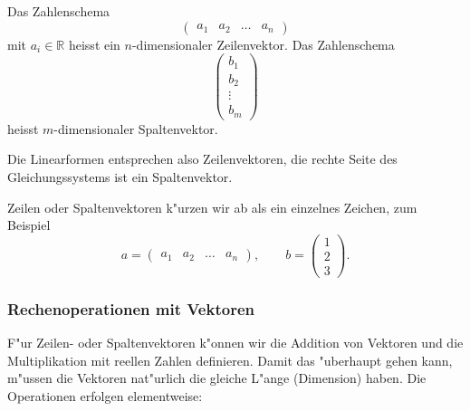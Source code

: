 \begin{definition}
Das Zahlenschema
\[
\begin{pmatrix}
a_1&a_2&\dots&a_n
\end{pmatrix}
\]
mit $a_i\in\mathbb R$ heisst ein $n$-dimensionaler Zeilenvektor.
Das Zahlenschema
\[
\begin{pmatrix}
b_1\\b_2\\\vdots\\b_m
\end{pmatrix}
\]
heisst $m$-dimensionaler Spaltenvektor.
\end{definition}
Die Linearformen entsprechen also Zeilenvektoren, die rechte
Seite des Gleichungssystems ist ein Spaltenvektor.

Zeilen oder Spaltenvektoren k"urzen wir ab als ein einzelnes
Zeichen, zum Beispiel
\[
a
=
\begin{pmatrix}
a_1&a_2&\dots&a_n
\end{pmatrix},\qquad
b=\begin{pmatrix}
1\\2\\3
\end{pmatrix}.
\]

\subsubsection{Rechenoperationen mit Vektoren}
F"ur Zeilen- oder Spaltenvektoren k"onnen wir die Addition von
Vektoren und die Multiplikation mit reellen Zahlen definieren.
Damit das "uberhaupt gehen kann, m"ussen die Vektoren nat"urlich
die gleiche L"ange (Dimension) haben.
Die Operationen erfolgen elementweise:

